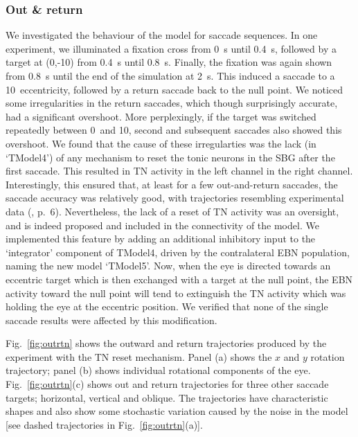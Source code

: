 \documentclass{frontiersSCNS}
\begin{document}
\subsubsection{Out \& return}

We investigated the behaviour of the model for saccade sequences.
In one experiment, we illuminated a fixation
cross from 0~s until 0.4~s, followed by a target at (0,-10\dg)
from 0.4~s until 0.8~s. Finally, the fixation was again shown from 0.8~s
until the end of the simulation at 2~s. This induced a saccade to a
10\dg~eccentricity, followed by a return saccade back to the
null point. We noticed some irregularities in the return saccades, which
though surprisingly accurate, had a significant overshoot.
More perplexingly, if the target was switched repeatedly between 0\dg~and
10\dg, second and subsequent  saccades also showed this
overshoot. We found that the cause of these irregularties was the
lack (in `TModel4') of any mechanism to reset the tonic neurons in the
SBG after the first saccade. This resulted in TN activity in the left
channel  in the right channel. Interestingly, this ensured
that, at  least for a few out-and-return saccades, the saccade accuracy was
relatively good, with trajectories resembling experimental data
(\cite{bahill_trajectories_1979}, p.~6). %
Nevertheless, the lack of a reset of TN activity was an oversight, and
is indeed proposed and included in the connectivity of the
\cite{gancarz_neural_1998} model. We implemented this feature by adding an
additional inhibitory input to the `integrator' component of TModel4,
driven by the contralateral EBN population, naming the new model `TModel5'.
Now, when the eye is directed towards an eccentric target which is then
exchanged with a target at the null point, the EBN activity toward the
null point will tend to extinguish the TN activity which was holding
the eye at the eccentric position.
We verified that none of the single saccade results were affected
by this modification.
%

Fig.~\ref{fig:outrtn} shows the
outward and return trajectories produced by the experiment
with the TN reset mechanism. Panel (a)
shows the $x$ and $y$ rotation trajectory; panel (b) shows individual
rotational components of the eye. Fig.~\ref{fig:outrtn}(c) shows
out and return trajectories for three other saccade targets; horizontal,
vertical and oblique. The trajectories have characteristic shapes and
also show some stochastic variation caused by the noise in the model [see
dashed trajectories in Fig.~\ref{fig:outrtn}(a)].
\end{document}
